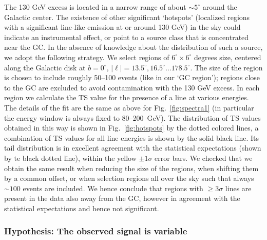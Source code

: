 \documentclass[aps,twocolumn,prd,superscriptaddress,showpacs,nofootinbib,fixfloat]{revtex4}
\begin{document}
The 130 GeV excess is located in a narrow range of about $\sim5^\circ$ around
the Galactic center. The existence of other significant `hotspots' (localized
regions with a significant line-like emission at or around 130 GeV) in the sky
could indicate an instrumental effect, or point to a source class that is
concentrated near the GC. In the absence of knowledge about the distribution of such
a source, we adopt the following strategy. We select regions of
$6^\circ\times6^\circ$ degrees size, centered along the Galactic disk at
$b=0^\circ$, $|\ell|=13.5^\circ, 16.5^\circ \dots 178.5^\circ$. The size of
the region is chosen to include roughly 50--100 events (like in our `GC
region'); regions close to the GC are excluded to avoid contamination with the
130 GeV excess. In each region we calculate the TS value for the presence of
a line at various energies. The details of the fit are the same as above for
Fig.~\ref{fig:spectra1} (in particular the energy window is always fixed to
80--200~GeV). The distribution of TS values obtained in this way is
shown in Fig.~\ref{fig:hotspots} by the dotted colored lines, a combination of
TS values for all line energies is shown by the solid black line. Its tail
distribution is in excellent agreement with the statistical expectations
(shown by te black dotted line), within the yellow $\pm1\sigma$ error bars. We
checked that we obtain the same result when reducing the size of the regions,
when shifting them by a common offset, or when selection regions all over the
sky such that always $\sim100$ events are included. We hence conclude that
regions with $\geq3\sigma$ lines are present in the data also away from the
GC, however in agreement with the statistical expectations and hence not
significant.

\subsubsection{Hypothesis: The observed signal is variable}
\end{document}
